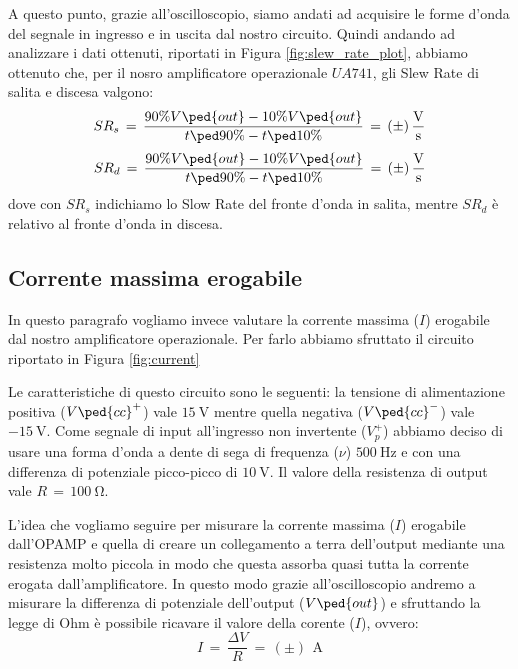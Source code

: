A questo punto, grazie all'oscilloscopio, siamo andati ad acquisire le forme d'onda del segnale in ingresso e in uscita dal nostro circuito. Quindi andando ad analizzare i dati ottenuti, riportati in Figura \ref{fig:slew_rate_plot}, abbiamo ottenuto che, per il nosro amplificatore operazionale $UA741$, gli Slew Rate di salita e discesa  valgono:
\begin{equation}
	SR_s\,=\,\frac{90\%V\ped{out}-10\%V\ped{out}}{t\ped{90\%}-t\ped{10\%}}\,=\,(\pm)\,\frac{\SI{}{\volt}}{\SI{}{\second}}
	\label{slew_rate_value_s}
\end{equation}
\begin{equation}
	SR_d\,=\,\frac{90\%V\ped{out}-10\%V\ped{out}}{t\ped{90\%}-t\ped{10\%}}\,=\,(\pm)\,\frac{\SI{}{\volt}}{\SI{}{\second}}
	\label{slew_rate_value_d}
\end{equation}
dove con $SR_s$ indichiamo lo Slow Rate del fronte d'onda in salita, mentre $SR_d$ è relativo al fronte d'onda in discesa.

\subsection*{Corrente massima erogabile}

In questo paragrafo vogliamo invece valutare la corrente massima ($I$) erogabile dal nostro amplificatore operazionale. Per farlo abbiamo sfruttato il circuito riportato in Figura \ref{fig:current}

Le caratteristiche di questo circuito sono le seguenti: la tensione di alimentazione positiva ($V\ped{cc}^+$) vale $\SI{+15}{\volt}$ mentre quella negativa ($V\ped{cc}^-$) vale $\SI{-15}{\volt}$. Come segnale di input all'ingresso non invertente ($V_p^+$) abbiamo deciso di usare una forma d'onda a dente di sega di frequenza ($\nu$) $\SI{500}{\hertz}$ e con una differenza di potenziale picco-picco di $\SI{10}{\volt}$. Il valore della resistenza di output vale $R\,=\,\SI{100}{\ohm}$.

L'idea che vogliamo seguire per misurare la corrente massima ($I$) erogabile dall'OPAMP e quella di creare un collegamento a terra dell'output mediante una resistenza molto piccola in modo che questa assorba quasi tutta la corrente erogata dall'amplificatore. In questo modo grazie all'oscilloscopio andremo a misurare la differenza di potenziale dell'output ($V\ped{out}$) e sfruttando la legge di Ohm è possibile ricavare il valore della corente ($I$), ovvero:
\begin{equation}
	I\,=\,\frac{\Delta V}{R}\,=\,(\pm)\,\SI{}{\ampere}
\end{equation}

